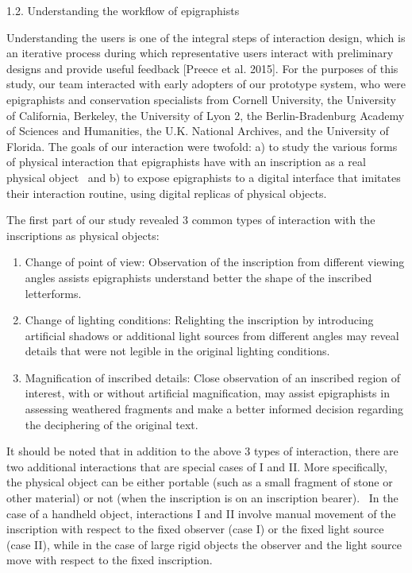 \documentclass[amsthm,ebook]{saparticle}
\begin{document}
1.2. Understanding the workflow of epigraphists

Understanding the users is one of the integral steps of interaction design, which is an iterative process during which
representative users interact with preliminary designs and provide useful feedback [Preece et al. 2015]. For the
purposes of this study, our team interacted with early adopters of our prototype system, who were epigraphists and
conservation specialists from Cornell University, the University of California, Berkeley, the University of Lyon 2, the
Berlin-Bradenburg Academy of Sciences and Humanities, the U.K. National Archives, and the University of Florida. The
goals of our interaction were twofold: a) to study the various forms of physical interaction that epigraphists have
with an inscription as a real physical object \ and b) to expose epigraphists to a digital interface that imitates
their interaction routine, using digital replicas of physical objects.

The first part of our study revealed 3 common types of interaction with the inscriptions as physical objects:

\begin{enumerate}
\item Change of point of view: Observation of the inscription from different viewing angles assists epigraphists
understand better the shape of the inscribed letterforms. \ 
\item Change of lighting conditions: Relighting the inscription by introducing artificial shadows or additional light
sources from different angles may reveal details that were not legible in the original lighting conditions.
\item Magnification of inscribed details: Close observation of an inscribed region of interest, with or without
artificial magnification, may assist epigraphists in assessing weathered fragments and make a better informed decision
regarding the deciphering of the original text.
\end{enumerate}
It should be noted that in addition to the above 3 types of interaction, there are two additional interactions that are
special cases of I and II. More specifically, the physical object can be either portable (such as a small fragment of
stone or other material) or not (when the inscription is on an inscription bearer). \ In the case of a handheld object,
interactions I and II involve manual movement of the inscription with respect to the fixed observer (case I) or the
fixed light source (case II), while in the case of large rigid objects the observer and the light source move with
respect to the fixed inscription. \ 
\end{document}
